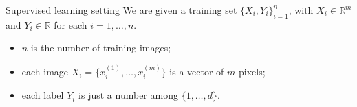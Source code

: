 \bgroup
\begin{frame}{Supervised learning setting}
We are given a training set $\{X_i, Y_i\}_{i=1}^n$, with $X_i \in \mathbb{R}^m$ and $Y_i \in \mathbb{R}$ for each $i=1,\ldots,n$.
\begin{itemize}
\item $n$ is the number of training images;
\item each image $X_i = \{x_i^{(1)}, \ldots , x_i^{(m)}\}$ is a vector of $m$ pixels;
\item each label $Y_i$ is just a number among $\{1, \ldots, d\}$.
\end{itemize}
\end{frame}
\egroup